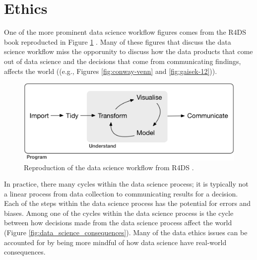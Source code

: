 \documentclass[../main.tex]{subfiles}
\begin{document}
    \section{Ethics}

    One of the more prominent data science workflow figures comes from the R4DS book reproducted in
    Figure \ref{fig:r4ds-data_science} \cite{wickhamR4ds}.
    Many of these figures that discuss the data science workflow miss the opporunity to discuss how
    the data products that come out of data science and the decisions that come from communicating findings,
    affects the world ((e.g., Figures \ref{fig:conway-venn} and \ref{fig:gaisek-12})).

    \begin{figure}[!hbtp]
        \centering
        \includegraphics[scale=0.5]{figs/050-intro/r4ds-data-science}
        \caption[R4DS: Data Science Workflow]{
        Reproduction of the data science workflow from R4DS \cite{wickhamR4ds}.
        }
        \label{fig:r4ds-data_science}
    \end{figure}

    In practice, there many cycles within the data science process; it is typically not a linear process from
    data collection to communicating results for a decision.
    Each of the steps within the data science process has the potential for errors and biases.
    Among one of the cycles within the data science process is the cycle between how decisions made from the data science process affect the world
    (Figure \ref{fig:data_science_consequences}).
    Many of the data ethics issues can be accounted for by being more mindful of how data science have real-world consequences.
\end{document}
